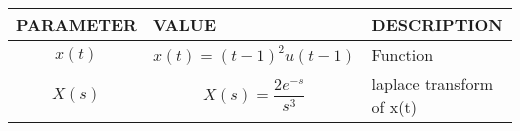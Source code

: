 \footnotesize
\begin{tabular}{|p{2cm}|p{2.5cm}|p{2.3cm}|}
    \hline
    PARAMETER & VALUE & DESCRIPTION  \\ \hline
    $$x(t)$$ & $$x(t)=(t-1)^2u(t-1)$$ & Function\\ \hline
    $$X(s)$$ & $$X(s)=\frac{2e^{-s}}{s^3}$$ & laplace transform of x(t) \\ \hline
  \end{tabular}

